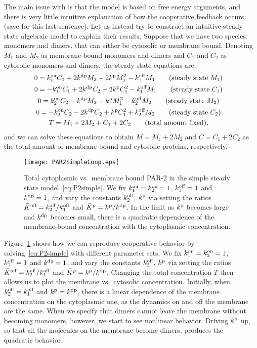 \documentclass[11pt]{article}
\newcommand{\6}[1]{#1_{\text{6}}}
\newcommand{\3}[1]{#1_{\text{3}}}
\begin{document}
The main issue with \cite{bland2023optimized} is that the model is based on free energy arguments, and there is very little intuitive explanation of how the cooperative feedback occurs (save for this last sentence). Let us instead try to construct an intuitive steady state algebraic model to explain their results. Suppose that we have two species: monomers and dimers, that can either be cytosolic or membrane bound. Denoting $M_1$ and $M_2$ as membrane-bound monomers and dimers and $C_1$ and $C_2$ as cytosolic monomers and dimers, the steady state equations are
\begin{subequations}
\label{eq:P2simple}
\begin{gather}
0 = k^\text{on}_1 C_1 + 2 k^\text{dp} M_2 - 2 k^\text{p} M_1^2 - k^\text{off}_1 M_1 \qquad \text{(steady state $M_1$)}\\
0 = -k^\text{on}_1 C_1 + 2 k^\text{dp} C_2 - 2 k^\text{p} C_1^2 - k^\text{off}_1 M_1  \qquad \text{(steady state $C_1$)} \\
0 = k^\text{on}_2 C_2 - k^\text{dp} M_2 + k^\text{p} M_1^2 - k^\text{off}_2 M_2 \qquad \text{(steady state $M_2$)} \\
0 = -k^\text{on}_2 C_2 - 2 k^\text{dp} C_2 + k^\text{p} C_1^2 + k^\text{off}_2 M_2  \qquad \text{(steady state $C_2$)} \\
T = M_1+2M_2+C_1+2C_2 \qquad \text{(total amount fixed)},
\end{gather}
\end{subequations}
and we can solve these equations to obtain $M=M_1+2M_2$ and $C=C_1+2C_2$ as the total amount of membrane-bound and cytosolic proteins, respectively.

\begin{figure}
\centering
\texttt{[image: PAR2SimpleCoop.eps]}
\caption{\label{fig:P2simple}Total cytoplasmic vs.\ membrane bound PAR-2 in the simple steady state model\ \eqref{eq:P2simple}. We fix $k^\text{on}_1=k^\text{on}_2=1$, $k^\text{off}_1=1$ and $k^\text{dp}=1$, and vary the constants $k^\text{off}_2$, $k^\text{p}$ via setting the ratios $\bar{K}^\text{off}=k^\text{off}_2/k^\text{off}_1$ and $\bar{K}^p = k^\text{p}/k^\text{dp}$. In the limit as $k^\text{p}$ becomes large and $k^\text{dp}$ becomes small, there is a quadratic dependence of the membrane-bound concentration with the cytoplasmic concentration. }
\end{figure}

Figure\ \ref{fig:P2simple} shows how we can reproduce cooperative behavior by solving\ \eqref{eq:P2simple} with different parameter sets. We fix $k^\text{on}_1=k^\text{on}_2=1$, $k^\text{off}_1=1$ and $k^\text{dp}=1$, and vary the constants $k^\text{off}_2$, $k^\text{p}$ via setting the ratios $\bar{K}^\text{off}=k^\text{off}_2/k^\text{off}_1$ and $\bar{K}^p = k^\text{p}/k^\text{dp}$.  Changing the total concentration $T$ then allows us to plot the membrane vs.\ cytosolic concentration. Initially, when $k^\text{off}_2=k^\text{off}_1$ and $k^\text{p}=k^\text{dp}$, there is a linear dependence of the membrane concentration on the cytoplasmic one, as the dynamics on and off the membrane are the same. When we specify that dimers cannot leave the membrane without becoming monomers, however, we start to see nonlinear behavior. Driving $k^\text{p}$ up, so that all the molecules on the membrane become dimers, produces the quadratic behavior. 
\end{document}
